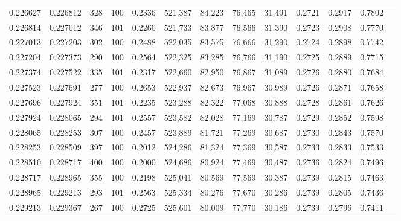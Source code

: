 \begin{tabular}{rrrrrrrrrrrrr}
0.226627 & 0.226812 &   328 & 100 &                                     0.2336 & 521,387 &  84,223 &  76,465 &  31,491 & 0.2721 & 0.2917 & 0.7802 \\
0.226814 & 0.227012 &   346 & 101 &                                     0.2260 & 521,733 &  83,877 &  76,566 &  31,390 & 0.2723 & 0.2908 & 0.7770 \\
0.227013 & 0.227203 &   302 & 100 &                                     0.2488 & 522,035 &  83,575 &  76,666 &  31,290 & 0.2724 & 0.2898 & 0.7742 \\
0.227204 & 0.227373 &   290 & 100 &                                     0.2564 & 522,325 &  83,285 &  76,766 &  31,190 & 0.2725 & 0.2889 & 0.7715 \\
0.227374 & 0.227522 &   335 & 101 &                                     0.2317 & 522,660 &  82,950 &  76,867 &  31,089 & 0.2726 & 0.2880 & 0.7684 \\
0.227523 & 0.227691 &   277 & 100 &                                     0.2653 & 522,937 &  82,673 &  76,967 &  30,989 & 0.2726 & 0.2871 & 0.7658 \\
0.227696 & 0.227924 &   351 & 101 &                                     0.2235 & 523,288 &  82,322 &  77,068 &  30,888 & 0.2728 & 0.2861 & 0.7626 \\
0.227924 & 0.228065 &   294 & 101 &                                     0.2557 & 523,582 &  82,028 &  77,169 &  30,787 & 0.2729 & 0.2852 & 0.7598 \\
0.228065 & 0.228253 &   307 & 100 &                                     0.2457 & 523,889 &  81,721 &  77,269 &  30,687 & 0.2730 & 0.2843 & 0.7570 \\
0.228253 & 0.228509 &   397 & 100 &                                     0.2012 & 524,286 &  81,324 &  77,369 &  30,587 & 0.2733 & 0.2833 & 0.7533 \\
0.228510 & 0.228717 &   400 & 100 &                                     0.2000 & 524,686 &  80,924 &  77,469 &  30,487 & 0.2736 & 0.2824 & 0.7496 \\
0.228717 & 0.228965 &   355 & 100 &                                     0.2198 & 525,041 &  80,569 &  77,569 &  30,387 & 0.2739 & 0.2815 & 0.7463 \\
0.228965 & 0.229213 &   293 & 101 &                                     0.2563 & 525,334 &  80,276 &  77,670 &  30,286 & 0.2739 & 0.2805 & 0.7436 \\
0.229213 & 0.229367 &   267 & 100 &                                     0.2725 & 525,601 &  80,009 &  77,770 &  30,186 & 0.2739 & 0.2796 & 0.7411 \\

\end{tabular}
